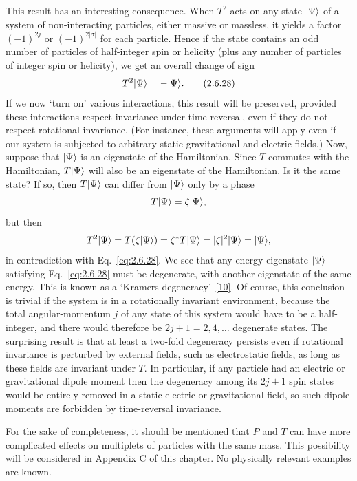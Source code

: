This result has an interesting consequence. When $T^2$ acts on any state
$\lvert \Psi\rangle$ of a system of non-interacting particles, either massive or
massless, it yields a factor $(-1)^{2j}$ or $(-1)^{2|\sigma|}$ for each
particle. Hence if the state contains an odd number of particles of
half-integer spin or helicity (plus any number of particles of integer spin or
helicity), we get an overall change of sign
\begin{equation}
T^2\lvert \Psi\rangle=-\lvert \Psi\rangle.
\tag{2.6.28}\label{eq:2.6.28}
\end{equation}
If we now `turn on' various interactions, this result will be preserved,
provided these interactions respect invariance under time-reversal, even if
they do not respect rotational invariance. (For instance, these arguments
will apply even if our system is subjected to arbitrary static gravitational
and electric fields.) Now, suppose that $\lvert \Psi\rangle$ is an eigenstate of the
Hamiltonian. Since $T$ commutes with the Hamiltonian, $T\lvert \Psi\rangle$ will also
be an eigenstate of the Hamiltonian. Is it the same state? If so, then
$T\lvert \Psi\rangle$ can differ from $\lvert \Psi\rangle$ only by a phase
\[
T\lvert \Psi\rangle=\zeta\lvert \Psi\rangle,
\]
but then
\[
T^2\lvert \Psi\rangle=T(\zeta\lvert \Psi\rangle)
=\zeta^*T\lvert \Psi\rangle=|\zeta|^2\lvert \Psi\rangle=\lvert \Psi\rangle,
\]
in contradiction with Eq.~\eqref{eq:2.6.28}. We see that any energy eigenstate
$\lvert \Psi\rangle$ satisfying Eq.~\eqref{eq:2.6.28} must be degenerate, with another
eigenstate of the same energy. This is known as a `Kramers
degeneracy'~\hyperref[ref:2.10]{[10]}. Of course, this conclusion is trivial if the
system is in a rotationally invariant environment, because the total
angular-momentum $j$ of any state of this system would have to be a
half-integer, and there would therefore be $2j+1=2,4,\ldots$ degenerate states.
The surprising result is that at least a two-fold degeneracy persists even if
rotational invariance is perturbed by external fields, such as electrostatic
fields, as long as these fields are invariant under $T$. In particular, if
any particle had an electric or gravitational dipole moment then the
degeneracy among its $2j+1$ spin states would be entirely removed in a static
electric or gravitational field, so such dipole moments are forbidden by
time-reversal invariance.

For the sake of completeness, it should be mentioned that $P$ and $T$ can
have more complicated effects on multiplets of particles with the same mass.
This possibility will be considered in Appendix C of this chapter. No
physically relevant examples are known.
